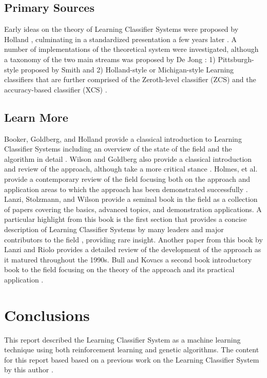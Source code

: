 \documentclass[a4paper, 11pt]{article}
\begin{document}
% 
% 
\subsection{Primary Sources}
Early ideas on the theory of Learning Classifier Systems were proposed by Holland \cite{Holland1976, Holland1977}, culminating in a standardized presentation a few years later \cite{Holland1980}.
A number of implementations of the theoretical system were investigated, although a taxonomy of the two main streams was proposed by De Jong \cite{Jong1988}: 1) Pittsburgh-style proposed by Smith \cite{Smith1980, Smith1983} and 2) Holland-style or Michigan-style Learning classifiers that are further comprised of the Zeroth-level classifier (ZCS) \cite{Wilson1994} and the accuracy-based classifier (XCS) \cite{Wilson1995}.

% 
% 
\subsection{Learn More}
Booker, Goldberg, and Holland provide a classical introduction to Learning Classifier Systems including an overview of the state of the field and the algorithm in detail \cite{Booker1989}. Wilson and Goldberg also provide a classical introduction and review of the approach, although take a more critical stance \cite{Wilson1989}.
Holmes, et al. provide a contemporary review of the field focusing both on the approach and application areas to which the approach has been demonstrated successfully \cite{Holmes2002}.
Lanzi, Stolzmann, and Wilson provide a seminal book in the field as a collection of papers covering the basics, advanced topics, and demonstration applications. A particular highlight from this book is the first section that provides a concise description of Learning Classifier Systems by many leaders and major contributors to the field \cite{Holland2000}, providing rare insight. Another paper from this book by Lanzi and Riolo provides a detailed review of the development of the approach as it matured throughout the 1990s.
Bull and Kovacs a second book introductory book to the field focusing on the theory of the approach and its practical application \cite{Bull2005}.

% 
% 
\section{Conclusions}
\label{sec:conclusions}
This report described the Learning Classifier System as a machine learning technique using both reinforcement learning and genetic algorithms. The content for this report based based on a previous work on the Learning Classifier System by this author \cite{Brownlee2007a}.
\end{document}
